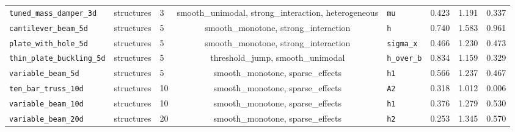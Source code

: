 \begin{table}[htbp]
\begin{tabular}{@{}lllclrrr@{}}
\texttt{tuned\_mass\_damper\_3d} & structures & 3 & smooth\_unimodal, strong\_interaction, heterogeneous & \texttt{mu} & 0.423 & 1.191 & 0.337 \\
\texttt{cantilever\_beam\_5d} & structures & 5 & smooth\_monotone, strong\_interaction & \texttt{h} & 0.740 & 1.583 & 0.961 \\
\texttt{plate\_with\_hole\_5d} & structures & 5 & smooth\_monotone, strong\_interaction & \texttt{sigma\_x} & 0.466 & 1.230 & 0.473 \\
\texttt{thin\_plate\_buckling\_5d} & structures & 5 & threshold\_jump, smooth\_unimodal & \texttt{h\_over\_b} & 0.834 & 1.159 & 0.329 \\
\texttt{variable\_beam\_5d} & structures & 5 & smooth\_monotone, sparse\_effects & \texttt{h1} & 0.566 & 1.237 & 0.467 \\
\texttt{ten\_bar\_truss\_10d} & structures & 10 & smooth\_monotone, sparse\_effects & \texttt{A2} & 0.318 & 1.012 & 0.006 \\
\texttt{variable\_beam\_10d} & structures & 10 & smooth\_monotone, sparse\_effects & \texttt{h1} & 0.376 & 1.279 & 0.530 \\
\texttt{variable\_beam\_20d} & structures & 20 & smooth\_monotone, sparse\_effects & \texttt{h2} & 0.253 & 1.345 & 0.570 \\
\bottomrule
\end{tabular}
\end{table}
